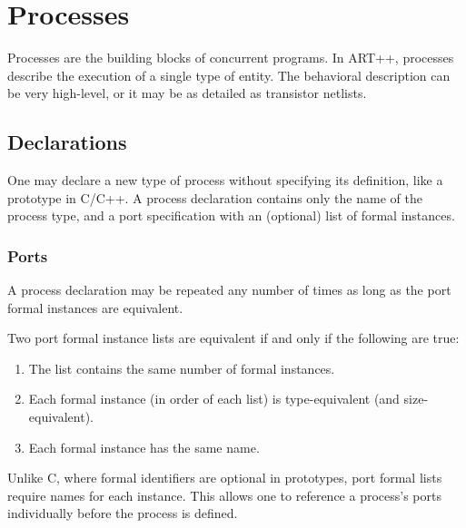 

\chapter{Processes}
\label{sec:processes}

Processes are the building blocks of concurrent programs.  
In ART++, processes describe the execution of a single type of entity.  
The behavioral description can be very high-level, 
or it may be as detailed as transistor netlists.  

\section{Declarations}
\label{sec:process:declarations}

One may declare a new type of process without specifying its definition, 
like a prototype in C/C++.  
A process declaration contains only the name of the process type, 
and a port specification with an (optional) list of formal instances.  

\subsection{Ports}
\label{sec:processes:declarations:ports}


A process declaration may be repeated any number of times as long
as the port formal instances are equivalent.  

Two port formal instance lists are equivalent
if and only if the following are true:
\begin{enumerate}
\item The list contains the same number of formal instances.  
\item Each formal instance (in order of each list) is type-equivalent
	(and size-equivalent).
\item Each formal instance has the same name.  
\end{enumerate}

Unlike C, where formal identifiers are optional in prototypes, 
port formal lists require names for each instance.  
This allows one to reference a process's ports individually 
before the process is defined.  

